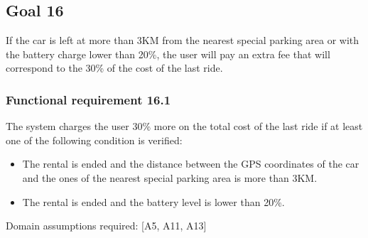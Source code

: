 \subsection{Goal 16}
If the car is left at more than 3KM from the nearest special parking area or with the battery charge lower than 20\%, the user will pay an extra fee that will correspond to the 30\% of the cost of the last ride.

\setcounter{secnumdepth}{3}
\subsubsection{Functional requirement 16.1}
The system charges the user 30\% more on the total cost of the last ride if at least one of the following condition is verified:
\begin{itemize}
	\item The rental is ended and the distance between the GPS coordinates of the car and the ones of the nearest special parking area is more than 3KM.
	\item The rental is ended and the battery level is lower than 20\%.
\end{itemize}

\noindent Domain assumptions required: [A5, A11, A13]
